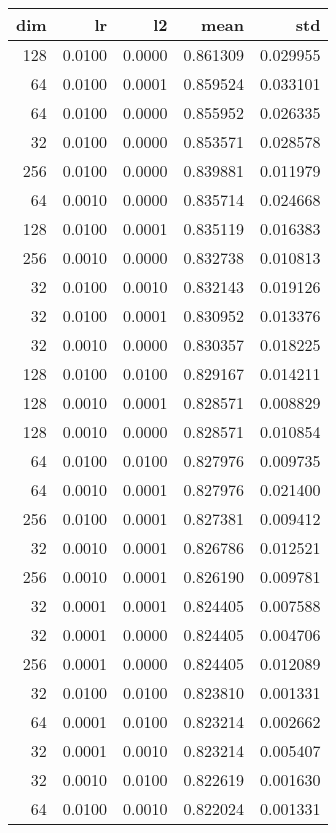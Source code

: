 \begin{tabular}{rrrrr}
\toprule
 dim &      lr &      l2 &      mean &       std \\
\midrule
 128 &  0.0100 &  0.0000 &  0.861309 &  0.029955 \\
  64 &  0.0100 &  0.0001 &  0.859524 &  0.033101 \\
  64 &  0.0100 &  0.0000 &  0.855952 &  0.026335 \\
  32 &  0.0100 &  0.0000 &  0.853571 &  0.028578 \\
 256 &  0.0100 &  0.0000 &  0.839881 &  0.011979 \\
  64 &  0.0010 &  0.0000 &  0.835714 &  0.024668 \\
 128 &  0.0100 &  0.0001 &  0.835119 &  0.016383 \\
 256 &  0.0010 &  0.0000 &  0.832738 &  0.010813 \\
  32 &  0.0100 &  0.0010 &  0.832143 &  0.019126 \\
  32 &  0.0100 &  0.0001 &  0.830952 &  0.013376 \\
  32 &  0.0010 &  0.0000 &  0.830357 &  0.018225 \\
 128 &  0.0100 &  0.0100 &  0.829167 &  0.014211 \\
 128 &  0.0010 &  0.0001 &  0.828571 &  0.008829 \\
 128 &  0.0010 &  0.0000 &  0.828571 &  0.010854 \\
  64 &  0.0100 &  0.0100 &  0.827976 &  0.009735 \\
  64 &  0.0010 &  0.0001 &  0.827976 &  0.021400 \\
 256 &  0.0100 &  0.0001 &  0.827381 &  0.009412 \\
  32 &  0.0010 &  0.0001 &  0.826786 &  0.012521 \\
 256 &  0.0010 &  0.0001 &  0.826190 &  0.009781 \\
  32 &  0.0001 &  0.0001 &  0.824405 &  0.007588 \\
  32 &  0.0001 &  0.0000 &  0.824405 &  0.004706 \\
 256 &  0.0001 &  0.0000 &  0.824405 &  0.012089 \\
  32 &  0.0100 &  0.0100 &  0.823810 &  0.001331 \\
  64 &  0.0001 &  0.0100 &  0.823214 &  0.002662 \\
  32 &  0.0001 &  0.0010 &  0.823214 &  0.005407 \\
  32 &  0.0010 &  0.0100 &  0.822619 &  0.001630 \\
  64 &  0.0100 &  0.0010 &  0.822024 &  0.001331 \\

\end{tabular}
